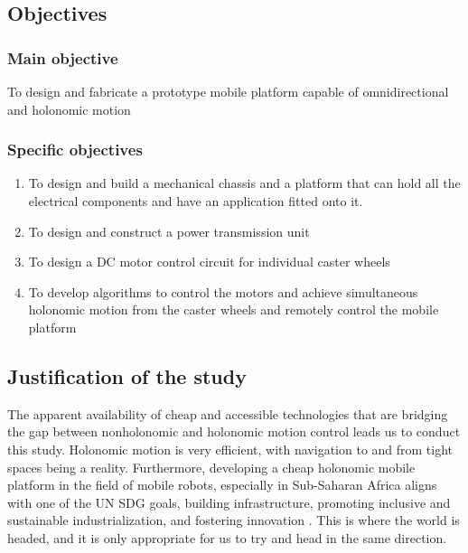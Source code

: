 \subsection{Objectives}

\subsubsection{Main objective}

To design and fabricate a prototype mobile platform capable of omnidirectional and holonomic motion

\subsubsection{Specific objectives}

\begin{enumerate}
	\item To design and build a mechanical chassis and a platform that can hold all the electrical components and have an application fitted onto it. \vspace*{.2cm}
	
	\item To design and construct a power transmission unit\vspace*{.2cm}
	
	\item To design a \ac{DC} motor control circuit for individual caster wheels\vspace*{.2cm}
	
	\item To develop  algorithms to control the motors and achieve simultaneous holonomic motion from the caster wheels and remotely control the mobile platform\vspace*{.2cm}
	
\end{enumerate}

\subsection{Justification of the study}

The apparent availability of cheap and accessible technologies that are bridging the gap between nonholonomic and holonomic motion control leads us to conduct this study.
Holonomic motion is very efficient, with navigation to and from tight spaces being a reality.
Furthermore, developing a cheap holonomic mobile platform in the field of mobile robots, especially in Sub-Saharan Africa aligns with one of the \ac{UN} \ac{SDG} goals, building infrastructure, promoting inclusive and sustainable industrialization, and fostering innovation \cite{noauthor_goal_nodate}.
This is where the world is headed, and it is only appropriate for us to try and head in the same direction. 
